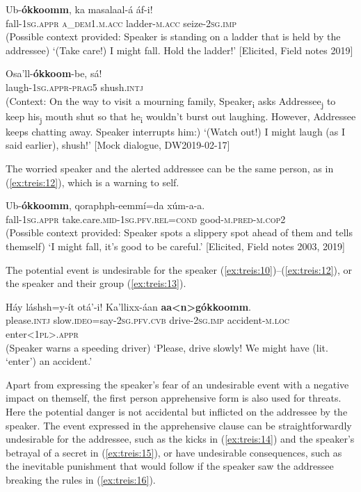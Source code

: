 \documentclass[output=paper,colorlinks,citecolor=brown,
]{langsci/langscibook}
\begin{document}
\ea\label{ex:treis:10} 
\gll Ub-\textbf{ókkoomm}, 	ka 					masalaal-á 	áf-i! \\
fall-\textsc{1sg.appr}		\textsc{a\_dem1.m.acc}	ladder-\textsc{m.acc}	seize-\textsc{2sg.imp}\\
\glt (Possible context provided: Speaker is standing on a ladder that is held by the addressee) `(Take care!) I might fall. Hold the ladder!'  [Elicited, Field notes 2019]
\z 

\ea\label{ex:treis:11} 
\gll Osa'll-\textbf{ókkoom}-be, 	sá! \\
laugh-\textsc{1sg.appr-prag5} shush.\textsc{intj}\\
\glt (Context: On the way to visit a mourning family, Speaker\textsubscript{i} asks Addressee\textsubscript{j} to keep his\textsubscript{j} mouth shut so that he\textsubscript{i} wouldn't burst out laughing. However, Addressee keeps chatting away. Speaker interrupts him:) `(Watch out!) I might laugh (as I said earlier), shush!' [Mock dialogue, DW2019-02-17]\\
\z 

The worried speaker and the alerted addressee can be the same person, as in (\ref{ex:treis:12}), which is a warning to self.

\ea\label{ex:treis:12} 
\gll Ub-\textbf{ókkoomm}, 	qoraphph-eemmí=da 					xúm-a-a. \\
fall-\textsc{1sg.appr}	take.care.\textsc{mid-1sg.pfv.rel=cond}	good-\textsc{m.pred-m.cop2}\\
\glt (Possible context provided: Speaker spots a slippery spot ahead of them and tells themself) `I might fall, it's good to be careful.'  [Elicited, Field notes 2003, 2019]
\z 

The potential event is undesirable for the speaker (\ref{ex:treis:10})--(\ref{ex:treis:12}), or the speaker and their group (\ref{ex:treis:13}).

\ea\label{ex:treis:13} 
\gll Háy 			láshsh=y-ít 				otá'-i! 			Ka'llixx-áan 		\textbf{aa<n>gókkoomm}. \\
please.\textsc{intj} slow.\textsc{ideo}=say-\textsc{2sg.pfv.cvb}	drive-\textsc{2sg.imp}	accident-\textsc{m.loc}	enter\textsc{<1pl>.appr}\\
\glt (Speaker warns a speeding driver) `Please, drive slowly! We might have (lit. `enter') an accident.' \citep[4.55]{KEB2008a}
\z 

Apart from expressing the speaker's fear of an undesirable event with a negative impact on themself, the first person apprehensive form is also used for threats. Here the potential danger is not accidental but inflicted on the addressee by the speaker. The event expressed in the apprehensive clause can be straightforwardly undesirable for the addressee, such as the kicks in (\ref{ex:treis:14}) and the speaker's betrayal of a secret in (\ref{ex:treis:15}), or have undesirable consequences, such as the inevitable punishment that would follow if the speaker saw the addressee breaking the rules in (\ref{ex:treis:16}).
\end{document}
